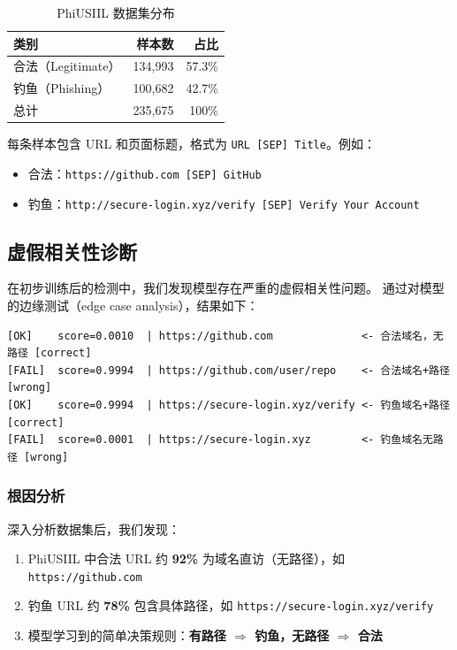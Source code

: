 \documentclass[11pt,a4paper]{article}
\begin{document}
\begin{table}[h]
\centering
\caption{PhiUSIIL 数据集分布}
\begin{tabular}{lrr}
\toprule
类别 & 样本数 & 占比 \\
\midrule
合法（Legitimate） & 134,993 & 57.3\% \\
钓鱼（Phishing） & 100,682 & 42.7\% \\
\midrule
总计 & 235,675 & 100\% \\
\bottomrule
\end{tabular}
\end{table}

每条样本包含 URL 和页面标题，格式为 \texttt{URL [SEP] Title}。例如：
\begin{itemize}
  \item 合法：\texttt{https://github.com [SEP] GitHub}
  \item 钓鱼：\texttt{http://secure-login.xyz/verify [SEP] Verify Your Account}
\end{itemize}

\subsection{虚假相关性诊断}

在初步训练后的检测中，我们发现模型存在严重的虚假相关性问题。
通过对模型的边缘测试（edge case analysis），结果如下：

\begin{Verbatim}[frame=single,fontsize=\small,label=边缘测试结果（增强前）]
[OK]    score=0.0010  | https://github.com              <- 合法域名，无路径 [correct]
[FAIL]  score=0.9994  | https://github.com/user/repo    <- 合法域名+路径 [wrong]
[OK]    score=0.9994  | https://secure-login.xyz/verify <- 钓鱼域名+路径 [correct]
[FAIL]  score=0.0001  | https://secure-login.xyz        <- 钓鱼域名无路径 [wrong]
\end{Verbatim}

\subsubsection{根因分析}

深入分析数据集后，我们发现：
\begin{enumerate}
  \item PhiUSIIL 中合法 URL 约 \textbf{92\%} 为域名直访（无路径），如 \texttt{https://github.com}
  \item 钓鱼 URL 约 \textbf{78\%} 包含具体路径，如 \texttt{https://secure-login.xyz/verify}
  \item 模型学习到的简单决策规则：\textbf{有路径 $\Rightarrow$ 钓鱼，无路径 $\Rightarrow$ 合法}
\end{enumerate}
\end{document}
